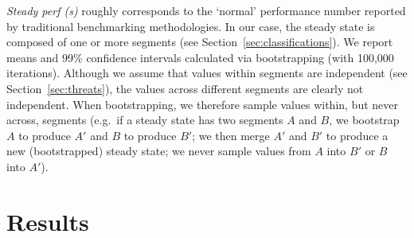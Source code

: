 \documentclass[acmsmall,screen]{acmart}
\begin{document}
\emph{Steady perf (s)} roughly corresponds to the `normal' performance number reported by
traditional benchmarking methodologies. In our case, the steady state is composed of one or more
segments (see Section~\ref{sec:classifications}). We report means and
99\% confidence intervals
calculated via bootstrapping (with 100,000 iterations). Although we
assume that values within segments are
independent (see Section~\ref{sec:threats}), the values across different segments are clearly not
independent. When bootstrapping, we therefore sample values within, but never
across, segments (e.g.~if a
steady state has two segments $A$ and $B$, we bootstrap $A$ to produce $A'$ and
$B$ to produce $B'$; we then merge $A'$ and $B'$ to produce a new (bootstrapped)
steady state; we never sample values from $A$ into $B'$ or $B$ into $A'$).


\section{Results}
\label{sec:results}
\end{document}
